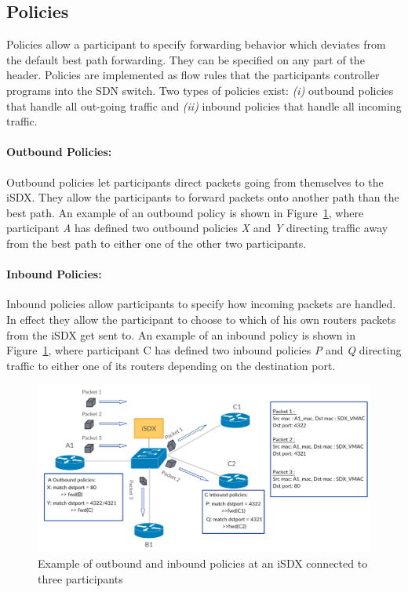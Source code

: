 \subsection{\label{chapter2:iSDX:policies}Policies}
Policies allow a participant to specify forwarding behavior which deviates from the default best path forwarding. They can be specified on any part of the header. Policies are implemented as flow rules that the participants controller programs into the SDN switch. Two types of policies exist: \emph{(i)} outbound policies that handle all out-going traffic and \emph{(ii)} inbound policies that handle all incoming traffic.

\paragraph{\label{chapter2:iSDX:policies:outbound policies}Outbound Policies:}
Outbound policies let participants direct packets going from themselves to the iSDX. They allow the participants to forward packets onto another path than the best path. An example of an outbound policy is shown in Figure~\ref{fig:isdx_policies}, where participant \emph{A} has defined two outbound policies \emph{X} and \emph{Y} directing traffic away from the best path to either one of the other two participants.

\paragraph{\label{chapter2:iSDX:policies:inbound policies}Inbound Policies:}
Inbound policies allow participants to specify how incoming packets are handled. In effect they allow the participant to choose to which of his own routers packets from the iSDX get sent to. An example of an inbound policy is shown in Figure~\ref{fig:isdx_policies}, where participant C has defined two inbound policies \emph{P} and \emph{Q} directing traffic to either one of its routers depending on the destination port. 

\begin{figure}[h]
\center
\includegraphics[scale = 0.31]{Figures/sdx_policies.pdf}
\caption{Example of outbound and inbound policies at an iSDX connected to three participants}
\label{fig:isdx_policies}
\end{figure}
  

